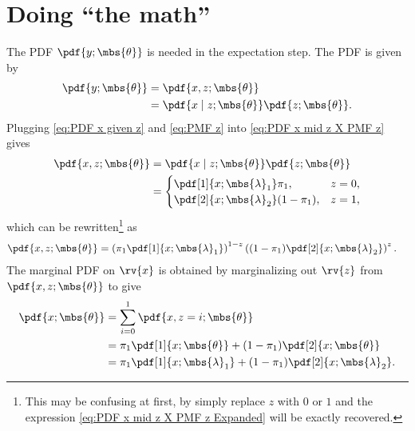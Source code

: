 \documentclass{tufte-handout}
\begin{document}
    \section{Doing ``the math''}
    The PDF $\pdf{y; \mbs{\theta}}$ is needed in the expectation step. The PDF is given by
    \begin{align}
        \pdf{y; \mbs{\theta}} 
        &= \pdf{x, z; \mbs{\theta}}\\
        \label{eq:PDF x mid z X PMF z}
        &= \pdf{x \mid z; \mbs{\theta}}\pdf{z; \mbs{\theta}}.        
    \end{align}
    Plugging \eqref{eq:PDF x given z} and \eqref{eq:PMF z} into  \eqref{eq:PDF x mid z X PMF z} gives
    \begin{align}
        \pdf{x, z; \mbs{\theta}}  &=
        \pdf{x \mid z; \mbs{\theta}}\pdf{z; \mbs{\theta}} \\
        \label{eq:PDF x mid z X PMF z Expanded}
        &=
        \begin{cases}
            \pdf[1]{x; \mbs{\lambda}_{1}}\pi_{1}, & z=0,\\
            \pdf[2]{x; \mbs{\lambda}_{2}}(1-\pi_{1}), & z=1,
        \end{cases}
    \end{align}
    which can be rewritten\footnote{This may be confusing at first, by simply replace $z$ with $0$ or $1$ and the expression \eqref{eq:PDF x mid z X PMF z Expanded} will be exactly recovered.} as
    \begin{align}
        \pdf{x, z; \mbs{\theta}} 
        &= 
        \left(\pi_{1}\pdf[1]{x; \mbs{\lambda}_{1}}\right)^{1-z}\left( (1-\pi_{1})\pdf[2]{x; \mbs{\lambda}_{2}} \right)^{z}.
    \end{align}
    The marginal PDF on $\rv{x}$ is obtained by marginalizing out $\rv{z}$ from $\pdf{x, z;\mbs{\theta}}$ to give
    \begin{align}
        \pdf{x; \mbs{\theta}} &= \sum_{i=0}^{1}\pdf{x, z=i; \mbs{\theta}}\\
        &= \pi_{1}\pdf[1]{x; \mbs{\theta}} + (1-\pi_{1})\pdf[2]{x; \mbs{\theta}}\\
        \label{eq:PDF x given theta Expanded}
        &= \pi_{1}\pdf[1]{x; \mbs{\lambda}_{1}} + (1-\pi_{1})\pdf[2]{x; \mbs{\lambda}_{2}}.
    \end{align}
\end{document}
